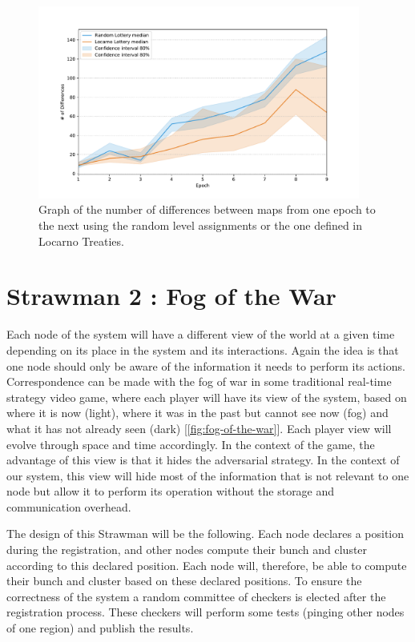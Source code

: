 \documentclass[a4paper,11pt,oneside]{report}
\begin{document}
\begin{figure}[!h] \centering
    \includegraphics[width=300pt]{figures/LocarnoTreaties-differences}
    \caption{Graph of the number of differences between maps from one epoch to
    the next using the random level assignments or the one defined in Locarno
    Treaties. } \label{fig:LocarnoTreaties-differences} \end{figure}

\section{Strawman 2 : Fog of the War} \label{sec:Fog-of-the-war}

Each node of the system will have a different view of the world at a given time
depending on its place in the system and its interactions. Again the idea is
that one node should only be aware of the information it needs to perform its
actions. Correspondence can be made with the fog of war in some traditional
real-time strategy video game, where each player will have its view of the
system, based on where it is now (light), where it was in the past but cannot
see now (fog) and what it has not already seen (dark)
[\autoref{fig:fog-of-the-war}].  Each player view will evolve through space and
time accordingly. In the context of the game, the advantage of this view is
that it hides the adversarial strategy. In the context of our system, this view
will hide most of the information that is not relevant to one node but allow it
to perform its operation without the storage and communication overhead. 

The design of this Strawman will be the following. Each node declares a
position during the registration, and other nodes compute their bunch and
cluster according to this declared position. Each node will, therefore, be able
to compute their bunch and cluster based on these declared positions. To ensure
the correctness of the system a random committee of checkers is elected after
the registration process. These checkers will perform some tests (pinging other
nodes of one region) and publish the results. 
\end{document}

